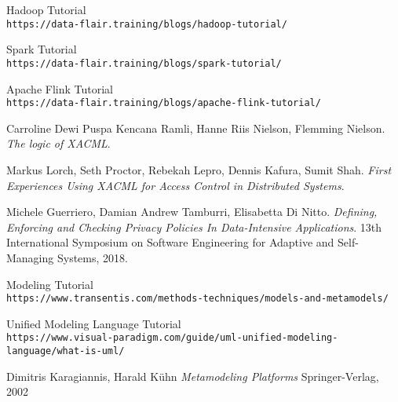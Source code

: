 \begin{thebibliography}{9}

Hadoop Tutorial
\\\texttt{https://data-flair.training/blogs/hadoop-tutorial/}

Spark Tutorial
\\\texttt{https://data-flair.training/blogs/spark-tutorial/}

Apache Flink Tutorial
\\\texttt{https://data-flair.training/blogs/apache-flink-tutorial/}

Carroline Dewi Puspa Kencana Ramli, Hanne Riis Nielson, Flemming Nielson.
\textit{The logic of XACML}.

Markus Lorch, Seth Proctor, Rebekah Lepro, Dennis Kafura, Sumit Shah.
\textit{First Experiences Using XACML for Access Control in Distributed Systems}.

Michele Guerriero, Damian Andrew Tamburri, Elisabetta Di Nitto.
\textit{Defining, Enforcing and Checking Privacy Policies In Data-Intensive Applications}. 
13th International Symposium on Software Engineering for Adaptive and Self-Managing Systems, 2018.

Modeling Tutorial
\\\texttt{https://www.transentis.com/methods-techniques/models-and-metamodels/}

Unified Modeling Language Tutorial
\\\texttt{https://www.visual-paradigm.com/guide/uml-unified-modeling-language/what-is-uml/}

Dimitris Karagiannis, Harald Kühn
\textit{Metamodeling Platforms}
Springer-Verlag, 2002


\end{thebibliography}
